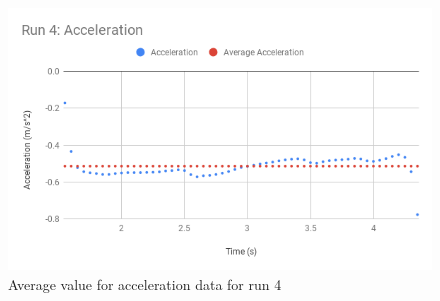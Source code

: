 %
\begin{figure}[ht]
    \centering
    \includegraphics[scale=0.71]{image/02-incline/Run-4-a.png}
    \caption{Average value for acceleration data for run 4}
    \label{figure:02.fit.a}
\end{figure}
%
